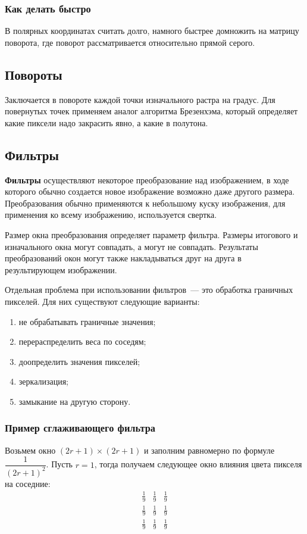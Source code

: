 \subsubsection{Как делать быстро}

В полярных координатах считать долго, намного быстрее домножить на матрицу поворота, где поворот рассматривается относительно прямой серого.

\subsection{Повороты}
Заключается в повороте каждой точки изначального растра на градус. Для повернутых точек применяем аналог алгоритма Брезенхэма, который определяет какие пиксели надо закрасить явно, а какие в полутона.

\subsection{Фильтры}
\textbf{Фильтры} осуществляют некоторое преобразование над изображением, в ходе которого обычно создается новое изображение возможно даже другого размера. Преобразования обычно применяются к небольшому куску изображения, для применения ко всему изображению, используется свертка.

Размер окна преобразования определяет параметр фильтра. Размеры итогового и изначального окна могут совпадать, а могут не совпадать. Результаты преобразований окон могут также накладываться друг на друга в результирующем изображении.

Отдельная проблема при использовании фильтров~--- это обработка граничных пикселей. Для них существуют следующие варианты:
\begin{enumerate}
    \item не обрабатывать граничные значения;
    \item перераспределить веса по соседям;
    \item доопределить значения пикселей;
    \item зеркализация;
    \item замыкание на другую сторону.
\end{enumerate}

\subsubsection{Пример сглаживающего фильтра}

Возьмем окно $(2r+1)\times(2r+1)$ и заполним равномерно по формуле $\dfrac 1 {(2r+1)^2}$. Пусть $r = 1$, тогда получаем следующее окно влияния цвета пикселя на соседние:
$$
    \begin{matrix}
        \frac 1 9 & \frac 1 9 & \frac 1 9 \\
        \frac 1 9 & \frac 1 9 & \frac 1 9 \\
        \frac 1 9 & \frac 1 9 & \frac 1 9 \\
    \end{matrix}
$$

